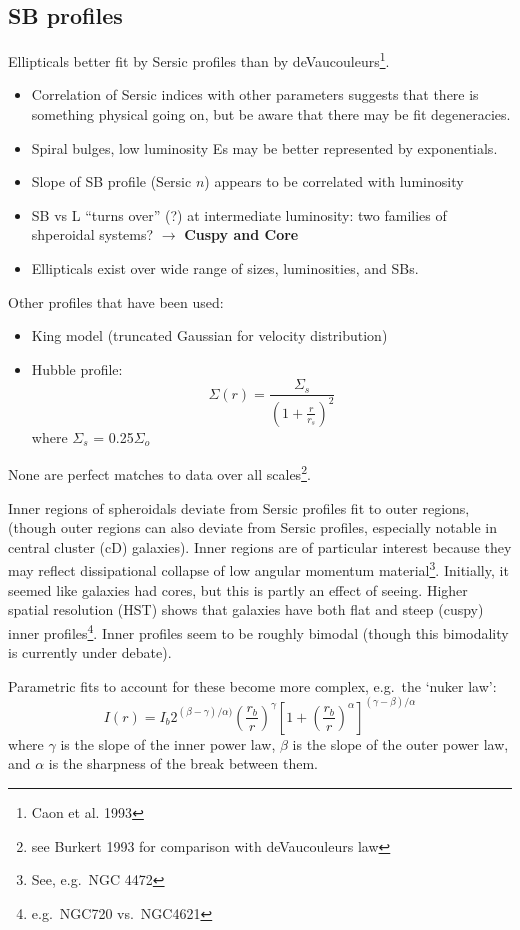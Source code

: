 \documentclass{article}
\newcommand{\mynotes}[1]{\textcolor{cadmiumgreen}{#1}}
\begin{document}
\subsection{SB profiles}
Ellipticals better fit by Sersic profiles than by
deVaucouleurs\footnote{Caon et al. 1993}.
\begin{itemize}
    \item Correlation of Sersic indices with other parameters
        suggests that there is something physical going on, but be aware that
        there may be fit degeneracies.
    \item Spiral bulges, low luminosity Es may be better
        represented by exponentials.
    \item Slope of SB profile (Sersic $n$) appears to be correlated with
        luminosity
    \item SB vs L ``turns over'' \mynotes{(?)} at intermediate luminosity:
        two families of shperoidal systems? \mynotes{
            $\rightarrow$ \textbf{Cuspy and Core}}
    \item Ellipticals exist over wide range of sizes, luminosities, and SBs.
\end{itemize}
Other profiles that have been used:
\begin{itemize}
    \item King model (truncated Gaussian for velocity distribution)
    \item Hubble profile:
        \[
            \Sigma(r) = \frac{\Sigma_{s}}{\left(1+\frac{r}{r_{s}}\right)^{2}}
        \]
        where $\Sigma_{s}$ = 0.25$\Sigma_{o}$
\end{itemize}
None are perfect matches to data over all scales\footnote{see Burkert 1993 for
comparison with deVaucouleurs law}.

Inner regions of spheroidals deviate from Sersic profiles fit to outer regions,
(though outer regions can also deviate from Sersic profiles,
especially notable in central cluster (cD) galaxies).
Inner regions are of particular interest because they may reflect dissipational
collapse of low angular momentum material\footnote{See, e.g.\ NGC 4472}.
Initially, it seemed like
galaxies had cores, but this is partly an effect of seeing. Higher spatial
resolution (HST) shows that galaxies have both flat and steep (cuspy) inner
profiles\footnote{e.g.\ NGC720 vs.\ NGC4621}.
Inner profiles seem to be roughly bimodal (though this bimodality is currently
under debate).

Parametric fits to account for these become more complex,
e.g.\ the `nuker law':
\[
    I(r) = I_{b}2^{(\beta-\gamma)/\alpha)}
    \left(\frac{r_{b}}{r}\right)^{\gamma}
    \left[1+\left(\frac{r_{b}}{r}\right)^{\alpha}\right]
    ^{\left(\gamma-\beta\right)/\alpha}
\]
where $\gamma$ is the slope of the inner power law, $\beta$ is
the slope of the outer power law, and $\alpha$ is the sharpness
of the break between them.
\end{document}

